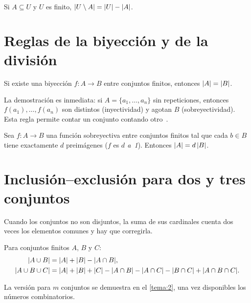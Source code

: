 \begin{proposicion}\label{prop:t1-complemento}
Si $A\subseteq U$ y $U$ es finito, $\lvert U\setminus A\rvert=\lvert U\rvert-\lvert A\rvert$.
\end{proposicion}

\addtocounter{definicion}{1}%

\section{Reglas de la biyección y de la división}

\begin{proposicion}\label{prop:t1-biyeccion}
Si existe una biyección $f\colon A\to B$ entre conjuntos finitos, entonces $\lvert A\rvert=\lvert B\rvert$.
\end{proposicion}

La demostración es inmediata: si $A=\{a_1,\dots,a_n\}$ sin repeticiones, entonces $f(a_1),\dots,f(a_n)$ son distintos (inyectividad) y agotan $B$ (sobreyectividad). Esta regla permite contar un conjunto contando otro~\cite[§14.1]{mcs}.

\addtocounter{definicion}{1}%

\begin{proposicion}\label{prop:t1-division}
Sea $f\colon A\to B$ una función sobreyectiva entre conjuntos finitos tal que cada $b\in B$ tiene exactamente $d$ preimágenes ($f$ es \emph{$d$ a~1}). Entonces $\lvert A\rvert=d\,\lvert B\rvert$.
\end{proposicion}

\section{Inclusión--exclusión para dos y tres conjuntos}

Cuando los conjuntos no son disjuntos, la suma de sus cardinales cuenta dos veces los elementos comunes y hay que corregirla.

\begin{teorema}\label{teo:t1-ie}
Para conjuntos finitos $A$, $B$ y $C$:
\begin{align*}
\lvert A\cup B\rvert&=\lvert A\rvert+\lvert B\rvert-\lvert A\cap B\rvert,\\
\lvert A\cup B\cup C\rvert&=\lvert A\rvert+\lvert B\rvert+\lvert C\rvert-\lvert A\cap B\rvert-\lvert A\cap C\rvert-\lvert B\cap C\rvert+\lvert A\cap B\cap C\rvert.
\end{align*}
\end{teorema}

La versión para $m$ conjuntos se demuestra en el \cref{tema:2}, una vez disponibles los números combinatorios.


